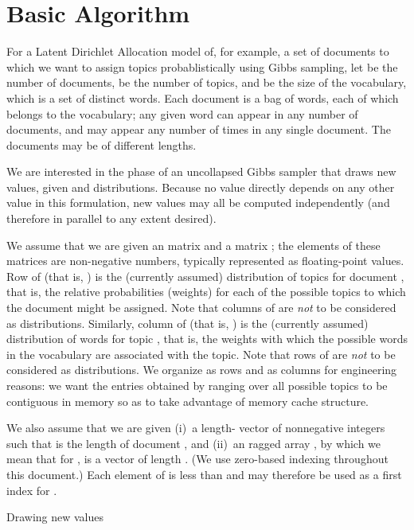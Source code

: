 \documentclass[10pt,nohyperref]{sigplanconf}
\newcommand*\Assign[2]{\State #1  #2}
\newcommand*\LocalArray[1]{\State {\bf local array} #1}
\newcommand*\Bind[2]{\State {\bf let} #1  #2}
\newcommand*\Remark[1]{\State  #1}
\newcommand*\ProcTwoX[1]{\State\hbox{\hskip-\algorithmicindent\hskip\wd\proctwobox#1}}
\newcommand*\UseCodeChunk[1]{\State {#1}}
\begin{document}
\section{Basic Algorithm}

For a Latent Dirichlet Allocation model of, for example, a set of documents to which we want to assign topics probablistically
using Gibbs sampling, let  be the number of documents,
 be the number of topics, and  be the size of the vocabulary, which is a set of distinct words.
Each document is a bag of words, each of which belongs to the vocabulary;
any given word can appear in any number of documents, and may appear any number of times in any single document.
The documents may be of different lengths.

We are interested in the phase of an uncollapsed Gibbs sampler that draws new  values, given  and  distributions.
Because no  value directly depends on any other  value in this formulation, new  values may all be computed independently
(and therefore in parallel to any extent desired).

We assume that we are given an  matrix  and a  matrix ; the elements of these matrices are
non-negative numbers, typically represented as floating-point values.
Row  of  (that is, ) is the (currently assumed) distribution of topics for document , that is,
the relative probabilities (weights) for each of the  possible topics to which the document might be assigned.
Note that columns of  are \emph{not} to be considered as distributions.
Similarly, column  of  (that is, ) is the (currently assumed) distribution of words for topic ,
that is, the weights with which the  possible words in the vocabulary are associated with the topic.
Note that rows of  are \emph{not} to be considered as distributions.
We organize  as rows and  as columns for engineering reasons:
we want the  entries obtained by ranging over all possible topics to be contiguous in memory
so as to take advantage of memory cache structure.

We also assume that we are given (i)~a length-
vector of nonnegative integers  such that  is the length of document , and (ii)~an  ragged array ,
by which we mean that for ,  is a vector of length .  (We use zero-based indexing throughout this document.)
Each element of  is less than  and may therefore be used as a first index for .


\begin{algorithm}[t]
\caption{Drawing new  values}\label{alg:basicdraw}
\end{algorithm}
\end{document}
